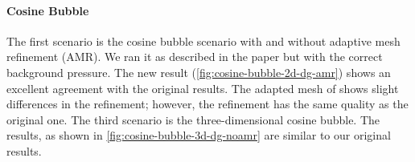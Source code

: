 \documentclass[runningheads]{llncs}
\begin{document}
\paragraph{Cosine Bubble}
The first scenario is the cosine bubble scenario with and without adaptive mesh refinement (AMR).
We ran it as described in the paper but with the correct background pressure. 
The new result (\cref{fig:cosine-bubble-2d-dg-amr}) shows an excellent agreement with the original results.
The adapted mesh of shows slight differences in the refinement; however, the refinement has the same quality as the original one.
The third scenario is the three-dimensional cosine bubble.
The results, as shown in \cref{fig:cosine-bubble-3d-dg-noamr} are similar to our original results.
\end{document}
